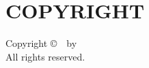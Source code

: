 \chapter*{COPYRIGHT}
\thispagestyle{plain}
\begin{center}
Copyright \copyright\ \ThesisYear\ by \ThesisAuthor\\
All rights reserved.
\end{center}
\clearpage
